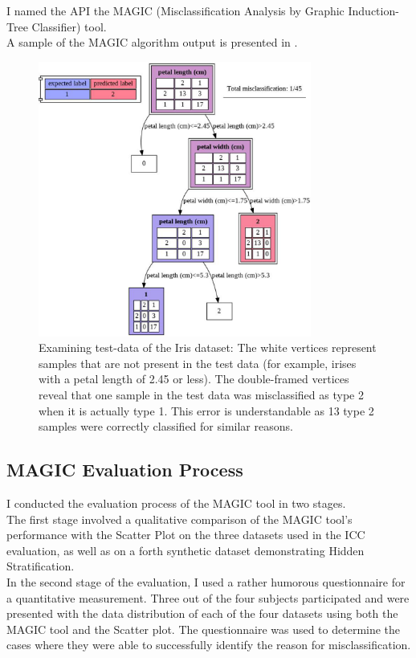 \documentclass[11pt]{article}
\begin{document}
I named the API the MAGIC (Misclassification Analysis by Graphic Induction-Tree Classifier) tool.\\
A sample of the MAGIC algorithm output is presented in .

\begin{figure}[H]
\centering
\includegraphics[width=0.8\textwidth]{iris-magic.png}

\caption{Examining test-data of the Iris dataset: The white vertices represent samples that are not present in the test data (for example, irises with a petal length of 2.45 or less). The double-framed vertices reveal that one sample in the test data was misclassified as type 2 when it is actually type 1. This error is understandable as 13 type 2 samples were correctly classified for similar reasons.}
\label{fig:fig3}

\end{figure}

\subsection{MAGIC Evaluation Process}\label{MAGIC Evaluation Process}
I conducted the evaluation process of the MAGIC tool in two stages.\\
The first stage involved a qualitative comparison of the MAGIC tool's performance with the Scatter Plot on the three datasets used in the ICC evaluation, as well as on a forth synthetic dataset demonstrating Hidden Stratification.\\
In the second stage of the evaluation, I used a rather humorous questionnaire for a quantitative measurement. Three out of the four subjects participated and were presented with the data distribution of each of the four datasets using both the MAGIC tool and the Scatter plot. The questionnaire was used to determine the cases where they were able to successfully identify the reason for misclassification.
\end{document}
